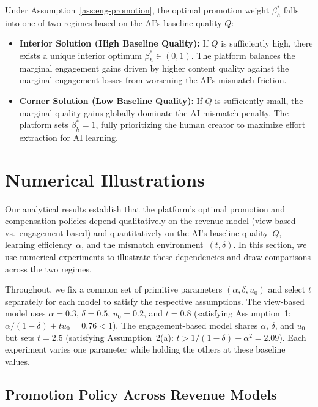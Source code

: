 \documentclass[mnsc,nonblindrev]{informs3_NoOR}
\begin{document}
\begin{proposition}
\label{prop:beta(eng)}
Under Assumption~\ref{ass:eng-promotion},  the optimal promotion weight $\beta_{h}^{*}$ falls into one of two regimes based on the AI's baseline quality $Q$:
\begin{itemize}
    \item[(i)] \textbf{Interior Solution (High Baseline Quality):} If $Q$ is sufficiently high, there exists a unique interior optimum $\beta_{h}^{*} \in (0, 1)$. The platform balances the marginal engagement gains driven by higher content quality against the marginal engagement losses from worsening the AI's mismatch friction.
    \item[(ii)] \textbf{Corner Solution (Low Baseline Quality):} If $Q$ is sufficiently small, the marginal quality gains globally dominate the AI mismatch penalty. The platform sets $\beta_{h}^{*} = 1$, fully prioritizing the human creator to maximize effort extraction for AI learning.
\end{itemize}
\end{proposition}


\section{Numerical Illustrations}
 
Our analytical results establish that the platform's optimal promotion and compensation policies depend qualitatively on the revenue model (view-based vs.\ engagement-based) and quantitatively on the AI's baseline quality~$Q$, learning efficiency~$\alpha$, and the mismatch environment~$(t, \delta)$. In this section, we use numerical experiments to illustrate these dependencies and draw comparisons across the two regimes.
 
Throughout, we fix a common set of primitive parameters $(\alpha, \delta, u_0)$ and select $t$ separately for each model to satisfy the respective assumptions. The view-based model uses $\alpha = 0.3$, $\delta = 0.5$, $u_0 = 0.2$, and $t = 0.8$ (satisfying Assumption~1: $\alpha/(1-\delta) + tu_0 = 0.76 < 1$). The engagement-based model shares $\alpha$, $\delta$, and $u_0$ but sets $t = 2.5$ (satisfying Assumption~2(a): $t > 1/(1-\delta) + \alpha^2 = 2.09$). Each experiment varies one parameter while holding the others at these baseline values.
 
\subsection{Promotion Policy Across Revenue Models}
 
\end{document}

